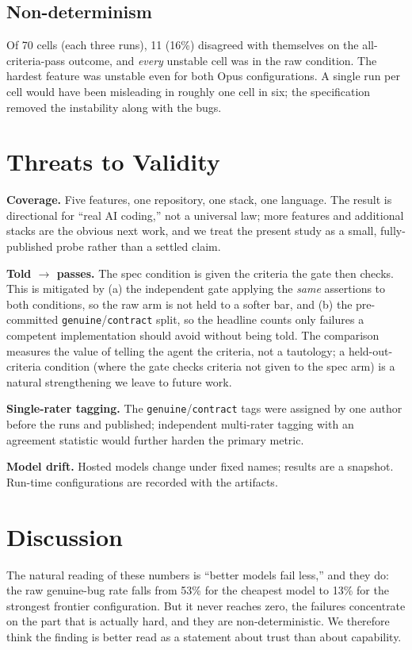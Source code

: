 \documentclass[11pt]{article}
\begin{document}
\subsection{Non-determinism}
Of 70 cells (each three runs), 11 (16\%) disagreed with themselves on the all-criteria-pass outcome, and \emph{every} unstable cell was in the raw condition. The hardest feature was unstable even for both Opus configurations. A single run per cell would have been misleading in roughly one cell in six; the specification removed the instability along with the bugs.

\section{Threats to Validity}

\textbf{Coverage.} Five features, one repository, one stack, one language. The result is directional for ``real AI coding,'' not a universal law; more features and additional stacks are the obvious next work, and we treat the present study as a small, fully-published probe rather than a settled claim.

\textbf{Told $\rightarrow$ passes.} The spec condition is given the criteria the gate then checks. This is mitigated by (a) the independent gate applying the \emph{same} assertions to both conditions, so the raw arm is not held to a softer bar, and (b) the pre-committed \texttt{genuine}/\texttt{contract} split, so the headline counts only failures a competent implementation should avoid without being told. The comparison measures the value of telling the agent the criteria, not a tautology; a held-out-criteria condition (where the gate checks criteria not given to the spec arm) is a natural strengthening we leave to future work.

\textbf{Single-rater tagging.} The \texttt{genuine}/\texttt{contract} tags were assigned by one author before the runs and published; independent multi-rater tagging with an agreement statistic would further harden the primary metric.

\textbf{Model drift.} Hosted models change under fixed names; results are a snapshot. Run-time configurations are recorded with the artifacts.

\section{Discussion}
\label{sec:discussion}

The natural reading of these numbers is ``better models fail less,'' and they do: the raw genuine-bug rate falls from 53\% for the cheapest model to 13\% for the strongest frontier configuration. But it never reaches zero, the failures concentrate on the part that is actually hard, and they are non-deterministic. We therefore think the finding is better read as a statement about trust than about capability.
\end{document}
